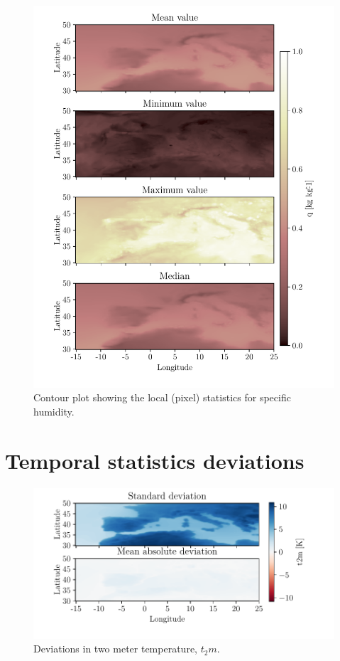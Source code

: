 \begin{figure}[ht]
    \centering
    \includegraphics{python_figs/all_stat_variable_q.pdf}
    \caption{Contour plot showing the local (pixel) statistics for specific humidity.}
    \label{fig:all_stats_q}
\end{figure}

\section{Temporal statistics deviations} \label{sec:all_stats_deviation}
\begin{figure}
    \centering
    \includegraphics{python_figs/DEVIATION_all_stat_variable_t2m.pdf}
    \caption{Deviations in two meter temperature, $t_2m$.}
    \label{fig:deviation_t2m}
\end{figure}


